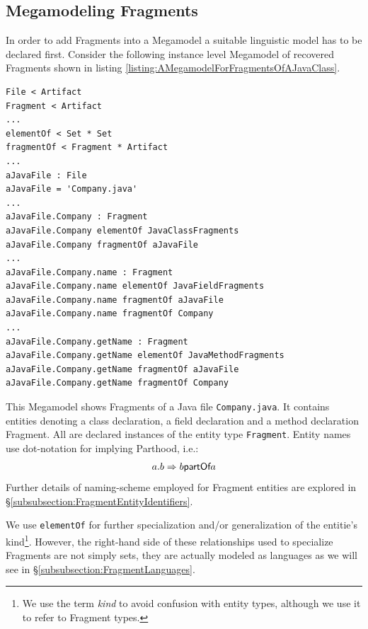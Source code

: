 \subsection{Megamodeling Fragments}
\label{subsection:MegamodelingFragments}
In order to add \glspl{Fragment} into a \gls{Megamodel} a suitable linguistic model has to be declared first. 
Consider the following instance level \gls{Megamodel} of recovered \glspl{Fragment} shown in listing \ref{listing:AMegamodelForFragmentsOfAJavaClass}.
\begin{lstlisting}[caption={A Megamodel for fragments of a Java class},label={listing:AMegamodelForFragmentsOfAJavaClass}]
File < Artifact
Fragment < Artifact
...
elementOf < Set * Set
fragmentOf < Fragment * Artifact
...
aJavaFile : File
aJavaFile = 'Company.java'
...
aJavaFile.Company : Fragment
aJavaFile.Company elementOf JavaClassFragments
aJavaFile.Company fragmentOf aJavaFile
...
aJavaFile.Company.name : Fragment
aJavaFile.Company.name elementOf JavaFieldFragments
aJavaFile.Company.name fragmentOf aJavaFile
aJavaFile.Company.name fragmentOf Company
...
aJavaFile.Company.getName : Fragment
aJavaFile.Company.getName elementOf JavaMethodFragments
aJavaFile.Company.getName fragmentOf aJavaFile
aJavaFile.Company.getName fragmentOf Company
\end{lstlisting}
This \gls{Megamodel} shows \glspl{Fragment} of a \gls{Java} file \texttt{Company.java}.
It contains entities denoting a class declaration, a field declaration and a method declaration \gls{Fragment}.
All are declared instances of the entity type \texttt{Fragment}.
Entity names use dot-notation for implying \gls{Parthood}, i.e.:
\begin{align*}
a.b \Rightarrow b \textsf{partOf} a
\end{align*}
Further details of naming-scheme employed for \gls{Fragment} entities are explored in §\ref{subsubsection:FragmentEntityIdentifiers}.

We use \texttt{elementOf} for further specialization and/or generalization of the entitie's kind\footnote{We use the term \textit{kind} to avoid confusion with entity types, although we use it to refer to \gls{Fragment} types.}.
However, the right-hand side of these relationships used to specialize \glspl{Fragment} are not simply sets, they are actually modeled as languages as we will see in §\ref{subsubsection:FragmentLanguages}.


